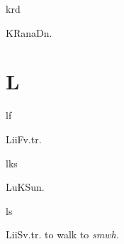 \begin{multicols*}{2}
\begin{dictroot}{kr}{d}
    \begin{dictentry}{KRanaD}{n.}
    \end{dictentry}
\end{dictroot}

\section*{L}

\begin{dictroot}{l}{f}
    \begin{dictentry}{LiiF}{v.tr.}
    \end{dictentry}
\end{dictroot}

\begin{dictroot}{l}{ks}
    \begin{dictentry}{LuKSu}{n.}
    \end{dictentry}
\end{dictroot}

\begin{dictroot}{l}{s}
    \begin{dictentry}{LiiS}{v.tr.}
        to walk to \textit{smwh.}
    \end{dictentry}
\end{dictroot}


\end{multicols*}
